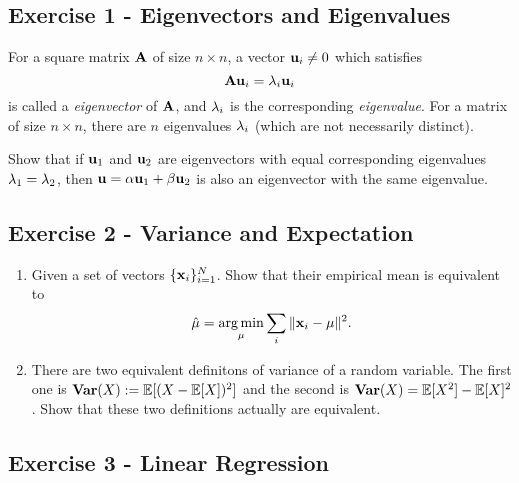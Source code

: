 \documentclass[
  letterpaper,
  DIV=11,
  numbers=noendperiod]{scrartcl}
\author{}
\date{}
\begin{document}
\subsection{Exercise 1 - Eigenvectors and
Eigenvalues}\label{exercise-1---eigenvectors-and-eigenvalues}

For a square matrix \(\mathbf{A}\) of size \(n \times n\), a vector
\(\mathbf{u}_i \neq 0\) which satisﬁes \begin{equation}
\mathbf{A}\mathbf{u}_i = \lambda_i \mathbf{u}_i
\label{eq:eigen}
\end{equation} is called a \emph{eigenvector} of \(\mathbf{A}\), and \(\lambda_i\)
is the corresponding \emph{eigenvalue}. For a matrix of size
\(n \times n\), there are \(n\) eigenvalues \(\lambda_i\) (which are not
necessarily distinct).

Show that if \(\mathbf{u}_1\) and \(\mathbf{u}_2\) are eigenvectors with equal
corresponding eigenvalues \(\lambda_1 = \lambda_2\), then
\(\mathbf{u} = \alpha \mathbf{u}_1 + \beta \mathbf{u}_2\) is also an eigenvector with the same
eigenvalue.

\subsection{Exercise 2 - Variance and
Expectation}\label{exercise-2---variance-and-expectation}

\begin{enumerate}
\def\labelenumi{(\alph{enumi})}
\item
  Given a set of vectors \(\{\mathbf{x}_i\}_{i=1}^N\). Show that their
  empirical mean is equivalent to
  \[\hat{\mu}=\operatorname*{arg\,min}_{\mathbf{\mu}} \sum_i \|\mathbf{x}_i - \mathbf{\mu}\|^2.\]
\item
  There are two equivalent definitons of variance of a random variable.
  The first one is \(\mathbf{Var}(X) := \mathbb{E}[(X - \mathbb{E}[X])^2]\) and the second is
  \(\mathbf{Var}(X) = \mathbb{E}[X^2] - \mathbb{E}[X]^2\). Show that these two definitions
  actually are equivalent.
\end{enumerate}

\subsection{Exercise 3 - Linear
Regression}\label{exercise-3---linear-regression}
\end{document}
